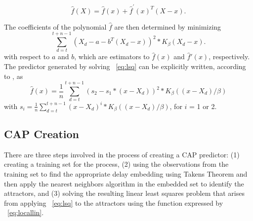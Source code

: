   \begin{equation}
    \label{eq:localtaylor}
    \hat{f}(X)=\hat{f}(x)+\hat{f}^{'}(x)^{T}(X-x).\nonumber
  \end{equation}

The coefficients of the polynomial $\hat{f}$ are then determined by minimizing
  \begin{equation}
    \label{eq:lsq}
    \displaystyle\sum_{d=t}^{t+n-1}\left(X_{d}-a-b^{T}(X_{d}-x)\right)^{2}*K_{\beta}(X_{d}-x).
  \end{equation}
 with respect to $a$ and $b$, which are estimators to
$\hat{f}(x)$ and $\hat{f}'(x)$, respectively.  The predictor generated
by solving \equationname~\eqref{eq:lsq} can be explicitly written, according to
\cite{Box1994}, as
  \begin{equation}
    \label{eq:locallin}
    \hat{f}(x)=\frac{1}{n}\displaystyle\sum_{d=t}^{t+n-1}(s_{2}-s_{1}*(x-X_{d}))^{2}* K_{\beta}((x-X_{d})/\beta)
  \end{equation}
with $s_{i}=\frac{1}{n}\displaystyle\sum_{d=t}^{t+n-1}(x-X_{d})^{i}*K_{\beta}((x-X_{d})/\beta)$, for $i$ = 1 or 2.
\subsection{CAP Creation}
\label{sec:cappcreate}
There are three steps involved in the process of creating a CAP predictor:
(1) creating a training set for the process, (2) using the
observations from the training set to find the appropriate delay
embedding using Takens Theorem and then apply the nearest neighbors
algorithm in the embedded set to identify the attractors, and (3)
solving the resulting linear least squares problem that arises from
applying \equationname~\eqref{eq:lsq} to the attractors using the
function expressed by \equationname~\eqref{eq:locallin}.


